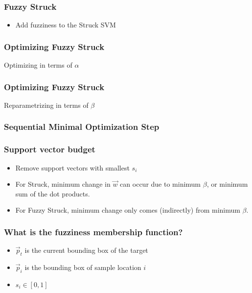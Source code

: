 
\begin{frame}
    \frametitle{Fuzzy Struck}
    \begin{itemize}
        \item Add fuzziness to the Struck SVM
    \end{itemize}
    \fuzzyStruckEquation
\end{frame}

\begin{frame}
    \frametitle{Optimizing Fuzzy Struck}
    Optimizing in terms of \(\alpha\)
    \fuzzyStruckDualAlpha
\end{frame}

\begin{frame}
    \frametitle{Optimizing Fuzzy Struck}
    Reparametrizing in terms of \(\beta\)
    \fuzzyStruckDualBeta
\end{frame}

\begin{frame}
    \frametitle{Sequential Minimal Optimization Step}
    \fuzzyStruckSmo
\end{frame}

\begin{frame}
    \frametitle{Support vector budget}
    \struckWeightChange
    \begin{itemize}
        \item Remove support vectors with smallest \(s_i\)
        \item For Struck, minimum change in \(\vec{w}\) can occur due to minimum \(\beta\), or
            minimum sum of the dot products.
        \item For Fuzzy Struck, minimum change only comes (indirectly) from minimum \(\beta\).
    \end{itemize}
\end{frame}

\begin{frame}
    \frametitle{What is the fuzziness membership function?}
    \fuzzyStruckFuzziness
    \begin{itemize}
        \item \(\vec{p}_t\) is the current bounding box of the target
        \item \(\vec{p}_i\) is the bounding box of sample location \(i\)
        \item \(s_i \in [0, 1]\)
    \end{itemize}
\end{frame}
